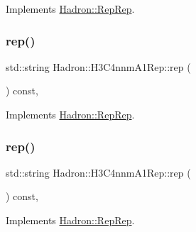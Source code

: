 Implements \mbox{\hyperlink{structHadron_1_1RepRep_ab3213025f6de249f7095892109575fde}{Hadron\+::\+Rep\+Rep}}.

\mbox{\label{structHadron_1_1H3C4nnmA1Rep_acd94f02734b3fffdeddaef313469d9dc}} 
\subsubsection{\texorpdfstring{rep()}{rep()}\hspace{0.1cm}{\footnotesize\ttfamily [2/5]}}
{\footnotesize\ttfamily std\+::string Hadron\+::\+H3\+C4nnm\+A1\+Rep\+::rep (\begin{DoxyParamCaption}{ }\end{DoxyParamCaption}) const\hspace{0.3cm}{\ttfamily [inline]}, {\ttfamily [virtual]}}



Implements \mbox{\hyperlink{structHadron_1_1RepRep_ab3213025f6de249f7095892109575fde}{Hadron\+::\+Rep\+Rep}}.

\mbox{\label{structHadron_1_1H3C4nnmA1Rep_acd94f02734b3fffdeddaef313469d9dc}} 
\subsubsection{\texorpdfstring{rep()}{rep()}\hspace{0.1cm}{\footnotesize\ttfamily [3/5]}}
{\footnotesize\ttfamily std\+::string Hadron\+::\+H3\+C4nnm\+A1\+Rep\+::rep (\begin{DoxyParamCaption}{ }\end{DoxyParamCaption}) const\hspace{0.3cm}{\ttfamily [inline]}, {\ttfamily [virtual]}}



Implements \mbox{\hyperlink{structHadron_1_1RepRep_ab3213025f6de249f7095892109575fde}{Hadron\+::\+Rep\+Rep}}.

\mbox{\label{structHadron_1_1H3C4nnmA1Rep_acd94f02734b3fffdeddaef313469d9dc}} 

